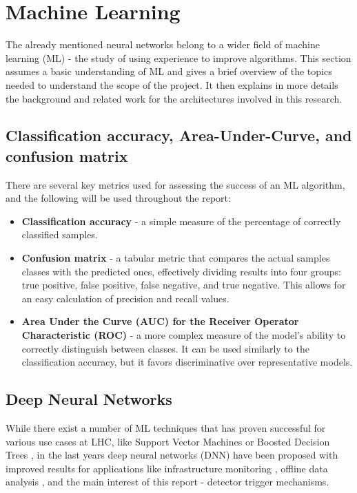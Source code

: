 \section{Machine Learning}
The already mentioned neural networks belong to a wider field of machine learning (ML) - the study of using experience to improve algorithms. This section assumes a basic understanding of ML and gives a brief overview of the topics needed to understand the scope of the project. It then explains in more details the background and related work for the architectures involved in this research.


\subsection{Classification accuracy, Area-Under-Curve, and confusion matrix} \label{ml-accuracy-auc-confusion}
There are several key metrics used for assessing the success of an ML algorithm, and the following will be used throughout the report:

\begin{itemize}
  \item \textbf{Classification accuracy} - a simple measure of the percentage of correctly classified samples.
  \item \textbf{Confusion matrix} - a tabular metric that compares the actual samples classes with the predicted ones, effectively dividing results into four groups: true positive, false positive, false negative, and true negative. This allows for an easy calculation of precision and recall values.
  \item \textbf{Area Under the Curve (AUC) for the Receiver Operator Characteristic (ROC)} - a more complex measure of the model's ability to correctly distinguish between classes. It can be used similarly to the classification accuracy, but it favors discriminative over representative models.
\end{itemize}


\subsection{Deep Neural Networks}
While there exist a number of ML techniques that has proven successful for various use cases at LHC, like Support Vector Machines \cite{38-valentino2012classification} or Boosted Decision Trees \cite{pmlr-v42-chen14}, in the last years deep neural networks (DNN) have been proposed with improved results for applications like infrastructure monitoring \cite{39-skoczen2016lstm}, offline data analysis \cite{40-ren2020unveiling}, and the main interest of this report - detector trigger mechanisms.

